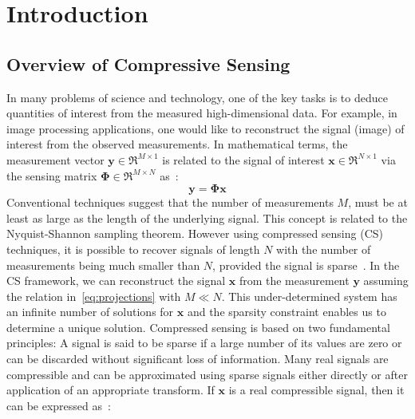 \chapter{Introduction}
\label{chap:intro}
\section{Overview of Compressive Sensing}
\label{sec: Chap_1_intro_CS}
In many problems of science and technology, one of the key tasks is to deduce quantities of interest from the measured high-dimensional data. For example, in image processing applications, one would like to reconstruct the signal (image) of interest from the observed measurements. In mathematical terms, the measurement vector  $\bm{y} \in \Re^{M \times 1}$ is related to the signal of interest $\bm{x} \in \Re^{N \times 1}$ via the sensing matrix $\bm{\Phi} \in \Re^{M \times N}$ as~\cite{Candes_CS, Candes_Comp_sampling}:
%
\begin{equation}
\label{eq:projections}
     \bm{y} = \bm{\Phi}\bm{x}
\end{equation}
%
Conventional techniques suggest that the number of measurements $M$, must be at least as large as the length of the underlying signal. This concept is related to the Nyquist-Shannon sampling theorem. However using compressed sensing (CS) techniques, it is possible to recover signals of length $N$ with the number of measurements being much smaller than $N$, provided the signal is sparse~\cite{Candes_Comp_sampling,CS_NS,Taocandes,Candes_Decoding,Romberg_imaging,Donoho}. In the CS framework, we can reconstruct the signal $\bm{x}$ from the measurement $\bm{y}$ assuming the relation in~\eqref{eq:projections} with $M \ll N$. This under-determined system has an infinite number of solutions for $\bm{x}$ and the sparsity constraint enables us to determine a unique solution. Compressed sensing is based on two fundamental principles:
%
A signal is said to be sparse if a large number of its values are zero or can be discarded without significant loss of information. Many real signals are compressible and can be approximated using sparse signals either directly or after application of an appropriate transform. If $\bm{x}$ is a real compressible signal, then it can be expressed as~\cite{Candes_CS, Candes_Comp_sampling}:
